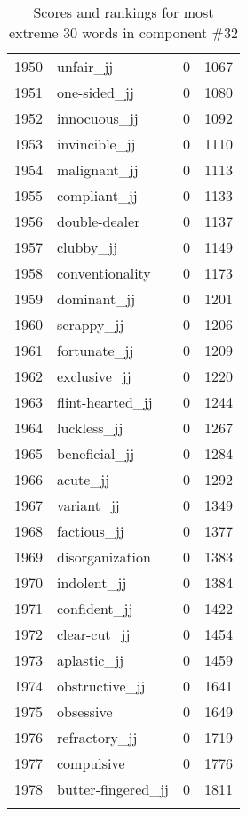 \begin{longtable}[!htbp]{| rlr@{.}l |}
    1950 & unfair\_jj & 0 & 1067 \\
    1951 & one-sided\_jj & 0 & 1080 \\
    1952 & innocuous\_jj & 0 & 1092 \\
    1953 & invincible\_jj & 0 & 1110 \\
    1954 & malignant\_jj & 0 & 1113 \\
    1955 & compliant\_jj & 0 & 1133 \\
    1956 & double-dealer & 0 & 1137 \\
    1957 & clubby\_jj & 0 & 1149 \\
    1958 & conventionality & 0 & 1173 \\
    1959 & dominant\_jj & 0 & 1201 \\
    1960 & scrappy\_jj & 0 & 1206 \\
    1961 & fortunate\_jj & 0 & 1209 \\
    1962 & exclusive\_jj & 0 & 1220 \\
    1963 & flint-hearted\_jj & 0 & 1244 \\
    1964 & luckless\_jj & 0 & 1267 \\
    1965 & beneficial\_jj & 0 & 1284 \\
    1966 & acute\_jj & 0 & 1292 \\
    1967 & variant\_jj & 0 & 1349 \\
    1968 & factious\_jj & 0 & 1377 \\
    1969 & disorganization & 0 & 1383 \\
    1970 & indolent\_jj & 0 & 1384 \\
    1971 & confident\_jj & 0 & 1422 \\
    1972 & clear-cut\_jj & 0 & 1454 \\
    1973 & aplastic\_jj & 0 & 1459 \\
    1974 & obstructive\_jj & 0 & 1641 \\
    1975 & obsessive & 0 & 1649 \\
    1976 & refractory\_jj & 0 & 1719 \\
    1977 & compulsive & 0 & 1776 \\
    1978 & butter-fingered\_jj & 0 & 1811 \\
    \hline
    \caption{Scores and rankings for most extreme 30 words in component \#32} \\
\end{longtable}
